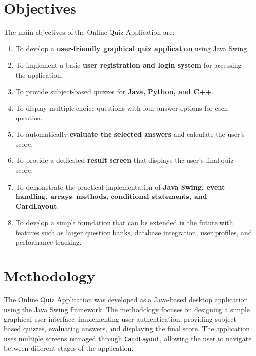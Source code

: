 \documentclass[11pt,a4paper]{report}  %
\begin{document}
\section{Objectives}
The main objectives of the Online Quiz Application are:
\begin{enumerate}
    \item To develop a \textbf{user-friendly graphical quiz application} using Java Swing.

    \item To implement a basic \textbf{user registration and login system} for accessing the application.

    \item To provide subject-based quizzes for \textbf{Java, Python, and C++}.

    \item To display multiple-choice questions with four answer options for each question.

    \item To automatically \textbf{evaluate the selected answers} and calculate the user's score.

    \item To provide a dedicated \textbf{result screen} that displays the user's final quiz score.

    \item To demonstrate the practical implementation of \textbf{Java Swing, event handling, arrays, methods, conditional statements, and CardLayout}.

    \item To develop a simple foundation that can be extended in the future with features such as larger question banks, database integration, user profiles, and performance tracking.
\end{enumerate}


\section{Methodology}

The Online Quiz Application was developed as a Java-based desktop application using the Java Swing framework. The methodology focuses on designing a simple graphical user interface, implementing user authentication, providing subject-based quizzes, evaluating answers, and displaying the final score. The application uses multiple screens managed through \texttt{CardLayout}, allowing the user to navigate between different stages of the application.
\end{document}

